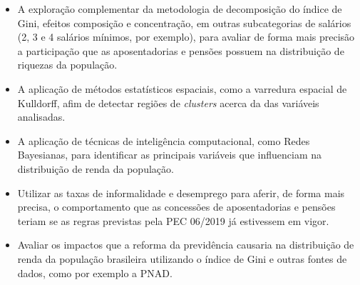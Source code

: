 \begin{itemize}
    \item A exploração complementar da metodologia de decomposição do índice de Gini, efeitos composição e concentração, em outras subcategorias de salários (2, 3 e 4 salários mínimos, por exemplo), para avaliar de forma mais precisão a participação que as aposentadorias e pensões possuem na distribuição de riquezas da população.
    
    \item A aplicação de métodos estatísticos espaciais, como a varredura espacial de Kulldorff, afim de detectar regiões de \textit{clusters} acerca da das variáveis analisadas.
    
    \item A aplicação de técnicas de inteligência computacional, como Redes Bayesianas, para identificar as principais variáveis que influenciam na distribuição de renda da população.
    
    \item Utilizar as taxas de informalidade e desemprego para aferir, de forma mais precisa, o comportamento que as concessões de aposentadorias e pensões teriam se as regras previstas pela PEC 06/2019 já estivessem em vigor.
    
    \item Avaliar os impactos que a reforma da previdência causaria na distribuição de renda da população brasileira utilizando o índice de Gini e outras fontes de dados, como por exemplo a PNAD. 
\end{itemize}